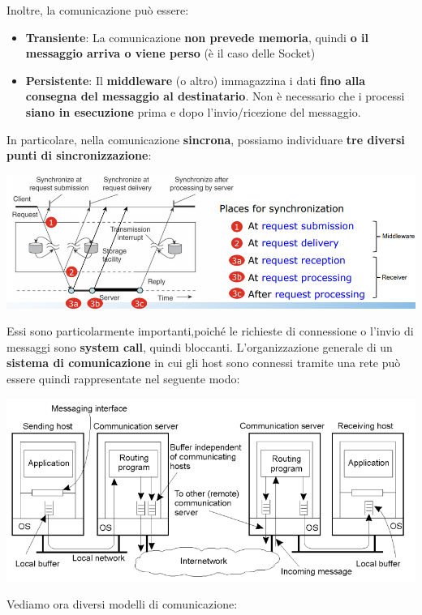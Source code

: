 \documentclass[12pt]{article}
\begin{document}
Inoltre, la comunicazione può essere:
\begin{itemize}
    \item \textbf{Transiente}: La comunicazione \textbf{non prevede memoria}, quindi \textbf{o il messaggio arriva o viene perso} (è il caso delle Socket)
    \item \textbf{Persistente}: Il \textbf{middleware} (o altro) immagazzina i dati \textbf{fino alla consegna del messaggio al destinatario}. Non è necessario che i processi \textbf{siano in esecuzione} prima e dopo l'invio/ricezione del messaggio.
\end{itemize}
In particolare, nella comunicazione \textbf{sincrona}, possiamo individuare \textbf{tre diversi punti di sincronizzazione}:
\begin{center}
    \includegraphics[width = 1.10\textwidth]{Images/129.PNG}
\end{center}
Essi sono particolarmente importanti,poiché le richieste di connessione o l'invio di messaggi sono \textbf{system call}, quindi bloccanti.\newline
L'organizzazione generale di un \textbf{sistema di comunicazione} in cui gli host sono connessi tramite una rete può essere quindi rappresentate nel seguente modo:
\begin{center}
    \includegraphics[width = 1\textwidth]{Images/130.PNG}
\end{center}
Vediamo ora diversi modelli di comunicazione:
\end{document}
